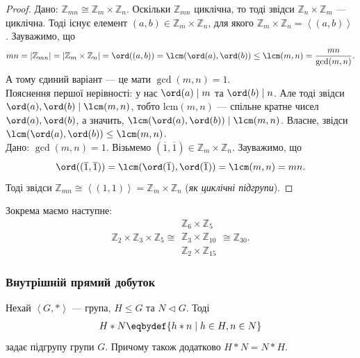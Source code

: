 \documentclass{math_library}
\begin{document}
\begin{proof}
\rightproof Дано: $\mathbb{Z}_{mn} \cong \mathbb{Z}_m \times \mathbb{Z}_n$. Оскільки $\mathbb{Z}_{mn}$ циклічна, то тоді звідси $\mathbb{Z}_n \times \mathbb{Z}_m$ --- циклічна. Тоді існує елемент $(a,b) \in \mathbb{Z}_m \times \mathbb{Z}_n$, для якого $\mathbb{Z}_m \times \mathbb{Z}_n = \left<(a,b)\right>$. Зауважимо, що
\[
mn = |\mathbb{Z}_{mn}| = |\mathbb{Z}_m \times \mathbb{Z}_n| = \ord((a,b)) = \lcm(\ord(a),\ord(b)) \leq \lcm(m,n) = \dfrac{mn}{\gcd(m,n)}.
\]
А тому єдиний варіант --- це мати $\gcd(m,n) = 1$.\\
Пояснення першої нерівності: у нас $\ord(a) \mid m$ та $\ord(b) \mid n$. Але тоді звідси $\ord(a), \ord(b) \mid \lcm(m,n)$, тобто $\text{lcm}(m,n)$ --- спільне кратне чисел $\ord(a),\ord(b)$, а значить, $\lcm(\ord(a),\ord(b)) \mid \lcm(m,n)$. Власне, звідси $\lcm(\ord(a),\ord(b)) \leq \lcm(m,n)$.
\bigskip \\
\leftproof Дано: $\gcd(m,n) = 1$. Візьмемо $(\overline{1},\overline{1}) \in \mathbb{Z}_m \times \mathbb{Z}_n$. Зауважимо, що \[
\ord((\overline{1},\overline{1})) = \lcm(\ord(\overline{1}),\ord(\overline{1})) = \lcm(m,n) = mn.
\]
Тоді звідси $\mathbb{Z}_{mn} \cong \left<(1,1)\right> = \mathbb{Z}_m \times \mathbb{Z}_n $ (\textit{як циклічні підгрупи}).
\end{proof}

\begin{example}
Зокрема маємо наступне:
\[
\mathbb{Z}_{2} \times \mathbb{Z}_3 \times \mathbb{Z}_5 \cong \begin{gathered} \mathbb{Z}_6 \times \mathbb{Z}_5 \\ \mathbb{Z}_3 \times \mathbb{Z}_{10} \\ \mathbb{Z}_{2} \times \mathbb{Z}_{15} \end{gathered} \cong \mathbb{Z}_{30}.
\]
\end{example}

\subsubsection{Внутрішній прямий добуток}
\begin{proposition}
Нехай $\left<G,*\right>$ --- група, $H \leq G$ та $N \triangleleft G$. Тоді
\begin{align*}
H*N \eqbydef \{ h*n \mid h \in H, n \in N \}
\end{align*}
задає підгрупу групи $G$. Причому також додатково $H*N = N*H$.
\end{proposition}
\end{document}
